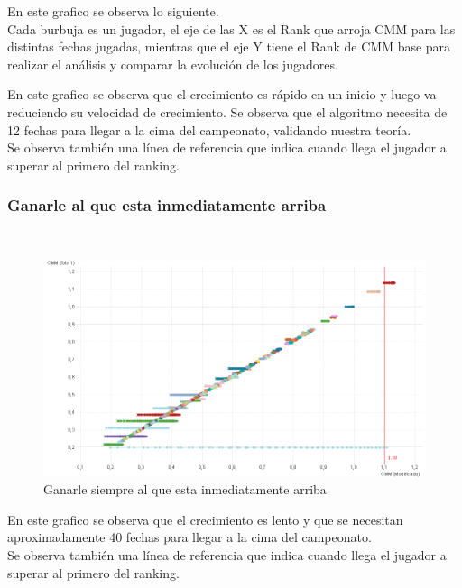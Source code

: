 En este grafico se observa lo siguiente.\\
Cada burbuja es un jugador, el eje de las X es el Rank que arroja CMM para las distintas fechas jugadas, mientras que el eje Y tiene el Rank de CMM base para 
realizar el análisis y comparar la evolución de los jugadores.

En este grafico se observa que el crecimiento es rápido en un inicio y luego va reduciendo su velocidad de crecimiento.
Se observa que el algoritmo necesita de 12 fechas para llegar a la cima del campeonato, validando nuestra teoría.\\

Se observa también una línea de referencia que indica cuando llega el jugador a superar al primero del ranking.\\

\subsubsection{Ganarle al que esta inmediatamente arriba}
\\

\begin{figure}[H]
\centering
\includegraphics[width=1\textwidth]{IMG/estrategia 4.png}
\caption{Ganarle siempre al que esta inmediatamente arriba}
\label{fig:Ganarle siempre al que esta inmediatamente arriba}
\end{figure}

En este grafico se observa que el crecimiento es lento y que se necesitan aproximadamente 40 fechas para llegar a la cima del campeonato.\\

Se observa también una línea de referencia que indica cuando llega el jugador a superar al primero del ranking.\\


